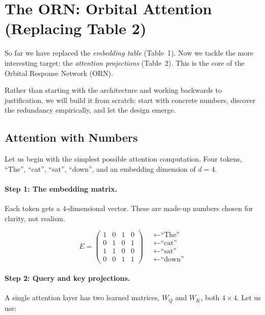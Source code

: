 \documentclass[11pt, a4paper]{article}
\theoremstyle{remark}
\begin{document}
\section{The ORN: Orbital Attention (Replacing Table 2)}
\label{sec:grn}

So far we have replaced the \emph{embedding table} (Table~1).
Now we tackle the more interesting target: the \emph{attention projections} (Table~2).
This is the core of the Orbital Response Network (ORN).



Rather than starting with the architecture and working backwards to justification, we will build it from scratch: start with concrete numbers, discover the redundancy empirically, and let the design emerge.

\subsection{Attention with Numbers}
\label{sec:grn:attn-numbers}

Let us begin with the simplest possible attention computation.
Four tokens, ``The'', ``cat'', ``sat'', ``down'', and an embedding dimension of $d = 4$.

\paragraph{Step 1: The embedding matrix.}
Each token gets a $4$-dimensional vector.
These are made-up numbers chosen for clarity, not realism.

\[
E = \begin{pmatrix}
1 & 0 & 1 & 0 \\
0 & 1 & 0 & 1 \\
1 & 1 & 0 & 0 \\
0 & 0 & 1 & 1
\end{pmatrix}
\quad
\begin{array}{l}
\leftarrow \text{``The''} \\
\leftarrow \text{``cat''} \\
\leftarrow \text{``sat''} \\
\leftarrow \text{``down''}
\end{array}
\]

\paragraph{Step 2: Query and key projections.}
A single attention layer has two learned matrices, $W_Q$ and $W_K$, both $4 \times 4$.
Let us use:
\end{document}
